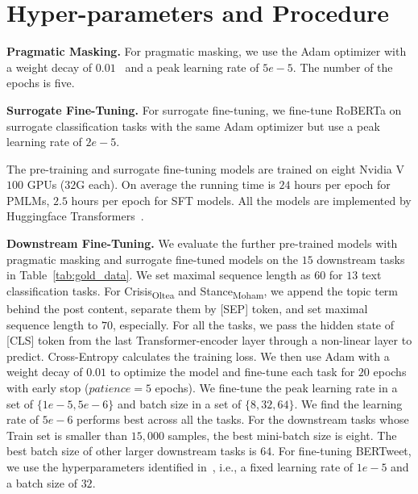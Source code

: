 \section{Hyper-parameters and Procedure}\label{subsec:models:hyperparameter}

\textbf{Pragmatic Masking.} For pragmatic masking, we use the Adam optimizer with a weight decay of $0.01$~\cite{loshchilov2018decoupled} and a peak learning rate of $5e-5$. The number of the epochs is five. 

\noindent \textbf{Surrogate Fine-Tuning.} For surrogate fine-tuning, we fine-tune RoBERTa on surrogate classification tasks with the same Adam optimizer but use a peak learning rate of $2e-5$. %

The pre-training and surrogate fine-tuning models are trained on eight Nvidia V$100$ GPUs ($32$G each). On average the running time is $24$ hours per epoch for PMLMs, $2.5$ hours per epoch for SFT models. All the models are implemented by Huggingface Transformers~\cite{wolf-2020-transformers}.%

\noindent \textbf{Downstream Fine-Tuning.} We evaluate the further pre-trained models with pragmatic masking and surrogate fine-tuned models on the $15$ downstream tasks in Table~\ref{tab:gold_data}. We set maximal sequence length as $60$ for $13$ text classification tasks. For Crisis\textsubscript{Oltea} and Stance\textsubscript{Moham}, we append the topic term behind the post content, separate them by [SEP] token, and set maximal sequence length to $70$, especially. For all the tasks, we pass the hidden state of [CLS] token from the last Transformer-encoder layer through a non-linear layer to predict. Cross-Entropy calculates the training loss. We then use Adam with a weight decay of $0.01$ to optimize the model and fine-tune each task for $20$ epochs with early stop ($patience = 5$ epochs). We fine-tune the peak learning rate in a set of $\{1e-5, 5e-6\}$ and batch size in a set of $\{8, 32, 64\}$. We find the learning rate of $5e-6$ performs best across all the tasks. For the downstream tasks whose Train set is smaller than $15,000$ samples, the best mini-batch size is eight. The best batch size of other larger downstream tasks is $64$. For fine-tuning BERTweet, we use the hyperparameters identified in~\citet{nguyen-etal-2020-bertweet}, i.e., a fixed learning rate of $1e-5$ and a batch size of $32$. 

